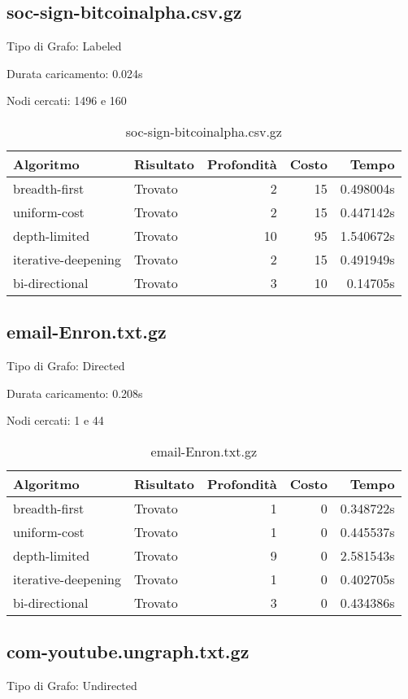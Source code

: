 \subsection{soc-sign-bitcoinalpha.csv.gz}
Tipo di Grafo: Labeled

Durata caricamento: 0.024s

Nodi cercati: 1496 e 160

\begin{table}[h]
\centering
\begin{tabular}{|l|l|r|r|r|}
\hline
\textbf{Algoritmo} & \textbf{Risultato} & \textbf{Profondità} & \textbf{Costo} & \textbf{Tempo} \\
 \hline
breadth-first & Trovato & 2 & 15 & 0.498004s \\
uniform-cost & Trovato & 2 & 15 & 0.447142s \\
depth-limited & Trovato & 10 & 95 & 1.540672s \\
iterative-deepening & Trovato & 2 & 15 & 0.491949s \\
bi-directional & Trovato & 3 & 10 & 0.14705s \\
\hline
\end{tabular}
\caption{soc-sign-bitcoinalpha.csv.gz}
\end{table}
\subsection{email-Enron.txt.gz}
Tipo di Grafo: Directed

Durata caricamento: 0.208s

Nodi cercati: 1 e 44

\begin{table}[h]
\centering
\begin{tabular}{|l|l|r|r|r|}
\hline
\textbf{Algoritmo} & \textbf{Risultato} & \textbf{Profondità} & \textbf{Costo} & \textbf{Tempo} \\
 \hline
breadth-first & Trovato & 1 & 0 & 0.348722s \\
uniform-cost & Trovato & 1 & 0 & 0.445537s \\
depth-limited & Trovato & 9 & 0 & 2.581543s \\
iterative-deepening & Trovato & 1 & 0 & 0.402705s \\
bi-directional & Trovato & 3 & 0 & 0.434386s \\
\hline
\end{tabular}
\caption{email-Enron.txt.gz}
\end{table}
\subsection{com-youtube.ungraph.txt.gz}
Tipo di Grafo: Undirected

